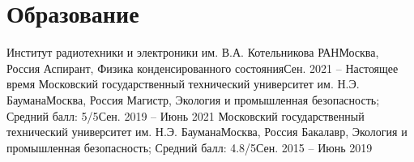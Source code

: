

\section{Образование}\label{sec:education}
\resumeSubHeadingListStart
\resumeSubheading
{Институт радиотехники и электроники им. В.А. Котельникова РАН}{Москва, Россия}
{Аспирант, Физика конденсированного состояния}{Сен. 2021 -- Настоящее время}
\resumeSubheading
{Московский государственный технический университет им. Н.Э. Баумана}{Москва, Россия}
{Магистр, Экология и промышленная безопасность; Средний балл: 5/5}{Сен. 2019 -- Июнь 2021}
\resumeSubheading
{Московский государственный технический университет им. Н.Э. Баумана}{Москва, Россия}
{Бакалавр, Экология и промышленная безопасность; Средний балл: 4.8/5}{Сен. 2015 -- Июнь 2019}
\resumeSubHeadingListEnd